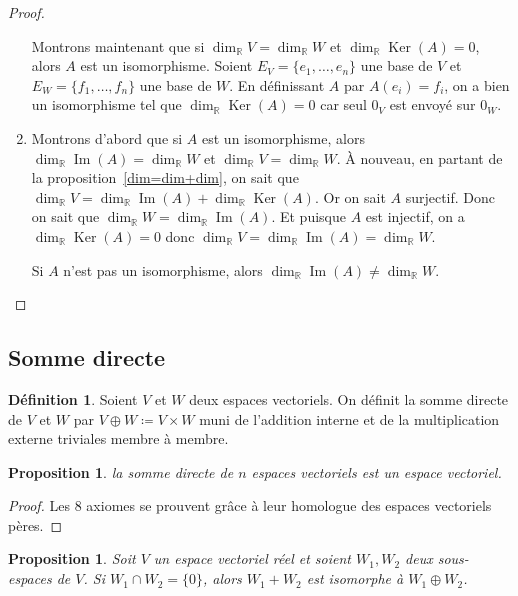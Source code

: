 \documentclass{article}
\DeclareMathOperator{\Ker}{Ker}
\DeclareMathOperator{\Imf}{Im}
\newcommand{\R}{\mathbb R}
\newtheorem{prp}[thm]{Proposition}
\theoremstyle{definition}
\newtheorem{déf}[thm]{Définition}
\theoremstyle{remark}
\begin{document}
\begin{proof}
\begin{enumerate}
			      Montrons maintenant que si $\dim_\R V = \dim_\R W$ et $\dim_\R \Ker(A) = 0$, alors $A$ est un isomorphisme. Soient $E_V = \{e_1, \dotsc, e_n\}$ une base
				  de $V$ et $E_W = \{f_1, \dotsc, f_n\}$ une base de $W$. En définissant $A$ par $A(e_i) = f_i$, on a bien un isomorphisme tel que $\dim_\R\Ker(A) = 0$
				  car seul $0_V$ est envoyé sur $0_W$.

			\item Montrons d'abord que si $A$ est un isomorphisme, alors $\dim_\R \Imf(A) = \dim_\R W$ et $\dim_\R V = \dim_\R W$. À nouveau, en partant de la
			      proposition~\ref{dim=dim+dim}, on sait que $\dim_\R V = \dim_\R \Imf(A) + \dim_\R\Ker(A)$. Or on sait $A$ surjectif. Donc on sait que
				  $\dim_\R W = \dim_\R\Imf(A)$. Et puisque $A$ est injectif, on a $\dim_\R\Ker(A) = 0$ donc $\dim_\R V = \dim_\R\Imf(A) = \dim_\R W$.

			      Si $A$ n'est pas un isomorphisme, alors $\dim_\R\Imf(A) \neq \dim_\R W$.
		\end{enumerate}
		\end{proof}

	\subsection{Somme directe}
		\begin{déf} Soient $V$ et $W$ deux espaces vectoriels. On définit la somme directe de $V$ et $W$ par $V \oplus W \coloneqq V \times W$ muni de l'addition interne et
		de la multiplication externe triviales membre à membre. \end{déf}

		\begin{prp} la somme directe de $n$ espaces vectoriels est un espace vectoriel. \end{prp}

		\begin{proof} Les 8 axiomes se prouvent grâce à leur homologue des espaces vectoriels pères. \end{proof}

		\begin{prp} Soit $V$ un espace vectoriel réel et soient $W_1, W_2$ deux sous-espaces de $V$. Si $W_1 \cap W_2 = \{0\}$, alors $W_1+W_2$ est isomorphe à
		$W_1 \oplus W_2$. \end{prp}
\end{document}
